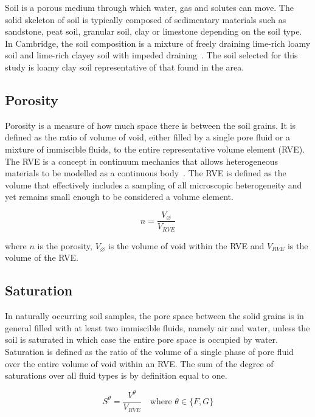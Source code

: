 \documentclass[twocolumn]{article}
\begin{document}
Soil is a porous medium through which water, gas and solutes can move. The solid skeleton of soil is typically composed of sedimentary materials such as sandstone, peat soil, granular soil, clay or limestone depending on the soil type. In Cambridge, the soil composition is a mixture of freely draining lime-rich loamy soil and lime-rich clayey soil with impeded draining~\cite{landis_2004,rhs_gardening_2009}. The soil selected for this study is loamy clay soil representative of that found in the area.

\subsection{Porosity}    \label{sec:porosity}
Porosity is a measure of how much space there is between the soil grains. It is defined as the ratio of volume of void, either filled by a single pore fluid or a mixture of immiscible fluids, to the entire representative volume element (RVE). The RVE is a concept in continuum mechanics that allows heterogeneous materials to be modelled as a continuous body~\cite{hill_1972}. The RVE is defined as the volume that effectively includes a sampling of all microscopic heterogeneity and yet remains small enough to be considered a volume element.

\begin{equation*}
    n = \frac{V_\varnothing}{V_{RVE}}
\end{equation*}

where $n$ is the porosity, $V_{\varnothing}$ is the volume of void within the RVE and $V_{RVE}$ is the volume of the RVE.

\subsection{Saturation}
In naturally occurring soil samples, the pore space between the solid grains is in general filled with at least two immiscible fluids, namely air and water, unless the soil is saturated in which case the entire pore space is occupied by water. Saturation is defined as the ratio of the volume of a single phase of pore fluid over the entire volume of void within an RVE. The sum of the degree of saturations over all fluid types is by definition equal to one.

\begin{equation*}
    S^{\theta} = \frac{V^{\theta}}{V_{RVE}} \quad\text{where $\theta \in \{F, G\}$}
\end{equation*}
\end{document}
